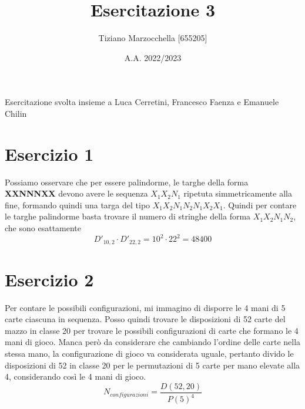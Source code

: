 \documentclass{article}
\title{Esercitazione 3}
\author{Tiziano Marzocchella [655205]}
\date{A.A. 2022/2023}
\begin{document}
\maketitle

\noindent Esercitazione svolta insieme a Luca Cerretini, Francesco Faenza e Emanuele Chilin

\section{Esercizio 1}
Possiamo osservare che per essere palindorme, le targhe della forma \textbf{XXNNNXX} devono avere le sequenza \(X_1 X_2 N_1\) 
ripetuta simmetricamente alla fine, formando quindi una targa del tipo \(X_1 X_2 N_1 N_2 N_1 X_2 X_1\).
Quindi per contare le targhe palindorme basta trovare il numero di stringhe della forma \(X_1 X_2 N_1 N_2\), che sono esattamente
\[D'_{10,2} \cdot D'_{22,2} = 10^2 \cdot 22^2 = 48400\]

\section{Esercizio 2}
Per contare le possibili configurazioni, mi immagino di disporre le 4 mani di 5 carte ciascuna in sequenza.
Posso quindi trovare le disposizioni di 52 carte del mazzo in classe 20 per trovare le possibili configurazioni di carte che formano le 4 mani di gioco. Manca però da considerare che cambiando l'ordine delle carte nella stessa mano, la configurazione di gioco va considerata uguale, pertanto divido le disposizioni di 52 in classe 20 per le permutazioni di 5 carte per mano elevate alla 4, considerando così le 4 mani di gioco.
\[N_{configurazioni} = \frac{D(52,20)}{P(5)^4}\]
\end{document}
